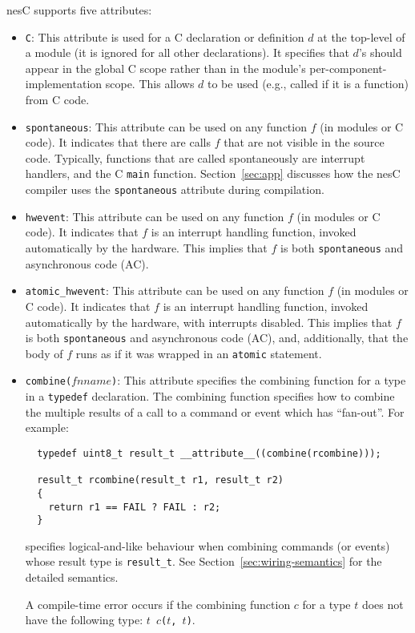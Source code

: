 \documentclass[11pt,letterpaper]{article}
\newcommand{\kw}[1]{{\tt #1}}
\newcommand{\code}[1]{{\tt #1}}
\newcommand{\nesc}{nesC\xspace}
\begin{document}
\nesc supports five attributes:
\begin{itemize}
\item \code{C}: This attribute is used for a C declaration or definition
$d$ at the top-level of a module (it is ignored for all other
declarations). It specifies that $d$'s should appear in the global C scope
rather than in the module's per-component-implementation scope. This allows
$d$ to be used (e.g., called if it is a function) from C code.

\item \code{spontaneous}: This attribute can be used on any function
$f$ (in modules or C code). It indicates that there are calls $f$ that
are not visible in the source code. Typically, functions that are
called spontaneously are interrupt handlers, and the C \code{main}
function. Section~\ref{sec:app} discusses how the \nesc compiler
uses the \code{spontaneous} attribute during compilation.

\item \code{hwevent}: This attribute can be used on any function
$f$ (in modules or C code). It indicates that $f$ is an interrupt
handling function, invoked automatically by the hardware. This implies
that $f$ is both \code{spontaneous} and asynchronous code (AC).

\item \code{atomic\_hwevent}: This attribute can be used on any function $f$
(in modules or C code). It indicates that $f$ is an interrupt handling
function, invoked automatically by the hardware, with interrupts
disabled. This implies that $f$ is both \code{spontaneous} and asynchronous
code (AC), and, additionally, that the body of $f$ runs as if it was
wrapped in an \code{atomic} statement.

\item \code{combine($fnname$)}: This attribute specifies the combining
function for a type in a \kw{typedef} declaration. The combining function
specifies how to combine the multiple results of a call to a command
or event which has ``fan-out''. For example:
\begin{verbatim}
  typedef uint8_t result_t __attribute__((combine(rcombine)));

  result_t rcombine(result_t r1, result_t r2)
  {
    return r1 == FAIL ? FAIL : r2;
  }
\end{verbatim}
specifies logical-and-like behaviour when combining commands (or events)
whose result type is \code{result\_t}. See
Section~\ref{sec:wiring-semantics} for the detailed semantics.

A compile-time error occurs if the combining function $c$ for a type $t$
does not have the following type: \code{$t$ $c$($t$, $t$)}.

\end{itemize}
\end{document}
